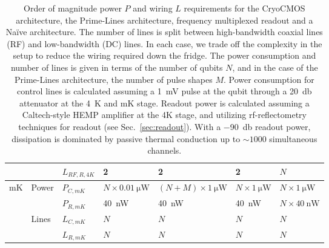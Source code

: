 {\begin{landscape}
\begin{table}
\begin{tabular}{|l|l|l|l|l|l|l|}
                        &                        & $L_{RF,R,4K}$ & 2                         & 2                        & 2   & $N$                 \\\hline
    \multirow{4}{*}{mK} & \multirow{2}{*}{Power} & $P_{C,mK}$ & $N\times\SI{0.01}{\micro\watt}$ & $ (N+M)\times\SI{1}{\micro\watt}$ & $N\times\SI{1}{\micro\watt}$   & $N\times\SI{1}{\micro\watt}$                   \\\cline{3-7}
                        &                        & $P_{R,mK}$ & \SI{40}{\nano\watt}     & \SI{40}{\nano\watt}           &\SI{40}{\nano\watt}   & $N\times\SI{40}{\nano\watt}$ \\\cline{2-7}
                        & \multirow{2}{*}{Lines} & $L_{C,mK}$ & $N$                     & $N$                           & $N$ & $N$                 \\\cline{3-7}
                        &                        & $L_{R,mK}$ & $N$                     & $N$                           & $N$ & $N$                 \\\hline
    \end{tabular}
    \caption[Approximate power and wiring requirements for a QC]{Order of magnitude power $P$ and wiring $L$ requirements for the CryoCMOS architecture, the Prime-Lines architecture, frequency multiplexed readout and a Na\"ive architecture. The number of lines is split between high-bandwidth coaxial lines (RF) and low-bandwidth (DC) lines. In each case, we trade off the complexity in the setup to reduce the wiring required down the fridge. The power consumption and number of lines is given in terms of the number of qubits $N$, and in the case of the Prime-Lines architecture, the number of pulse shapes $M$. Power consumption for control lines is calculated assuming a \SI{1}{\milli\volt} pulse at the qubit through a \SI{20}{\decibel} attenuator at the \SI{4}{\kelvin} and mK stage. Readout power is calculated assuming a Caltech-style HEMP amplifier at the 4K stage, and utilizing rf-reflectometry techniques for readout (see Sec.~\ref{sec:readout}). With a \SI{-90}{\decibel} readout power,
    dissipation is dominated by passive thermal conduction up to $\sim 1000$ simultaneous channels.}
    \label{tab:arch}
  \end{table}
\end{landscape}
}

